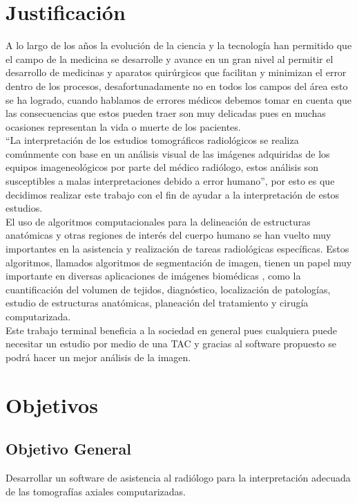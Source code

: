 \documentclass[12pt]{report}
\begin{document}
\section{Justificación}
A lo largo de los años la evolución de la ciencia y la tecnología han permitido que el campo de la medicina se desarrolle y avance en un gran nivel al permitir el desarrollo de medicinas y aparatos quirúrgicos que facilitan y minimizan el error dentro de los procesos, desafortunadamente no en todos los campos del área esto se ha logrado, cuando hablamos de errores médicos debemos tomar en cuenta que las consecuencias que estos pueden traer son muy delicadas pues en muchas ocasiones representan la vida o muerte de los pacientes.\\ 

“La interpretación de los estudios tomográficos radiológicos se realiza comúnmente con base en un análisis visual de las imágenes adquiridas de los equipos imageneológicos por parte del médico radiólogo, estos análisis son susceptibles a malas interpretaciones debido a error humano”, por esto es que decidimos realizar este trabajo con el fin de ayudar a la interpretación de estos estudios.\\

El uso de algoritmos computacionales para la delineación de estructuras anatómicas y otras regiones de interés del cuerpo humano se han vuelto muy importantes en la asistencia y realización de tareas radiológicas específicas. Estos algoritmos, llamados algoritmos de segmentación de imagen, tienen un papel muy importante en diversas aplicaciones de imágenes biomédicas , como la cuantificación del volumen de tejidos, diagnóstico, localización de patologías, estudio de estructuras anatómicas, planeación del tratamiento y cirugía computarizada.\cite{metodos}\\ 

Este trabajo terminal beneficia a la sociedad en general pues cualquiera puede necesitar un estudio por medio de una TAC y gracias al software propuesto se  podrá hacer un mejor análisis de la imagen.

\section{Objetivos}
\subsection{Objetivo General}
Desarrollar un software de asistencia al radiólogo para la interpretación adecuada de las tomografías axiales computarizadas.
\end{document}
